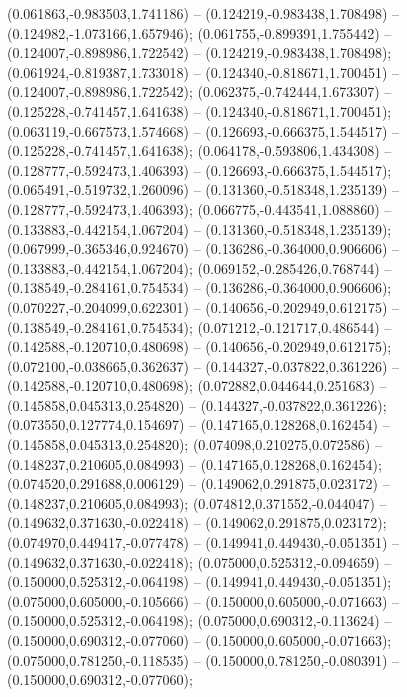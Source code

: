  (0.061863,-0.983503,1.741186) -- (0.124219,-0.983438,1.708498) -- (0.124982,-1.073166,1.657946);
 (0.061755,-0.899391,1.755442) -- (0.124007,-0.898986,1.722542) -- (0.124219,-0.983438,1.708498);
 (0.061924,-0.819387,1.733018) -- (0.124340,-0.818671,1.700451) -- (0.124007,-0.898986,1.722542);
 (0.062375,-0.742444,1.673307) -- (0.125228,-0.741457,1.641638) -- (0.124340,-0.818671,1.700451);
 (0.063119,-0.667573,1.574668) -- (0.126693,-0.666375,1.544517) -- (0.125228,-0.741457,1.641638);
 (0.064178,-0.593806,1.434308) -- (0.128777,-0.592473,1.406393) -- (0.126693,-0.666375,1.544517);
 (0.065491,-0.519732,1.260096) -- (0.131360,-0.518348,1.235139) -- (0.128777,-0.592473,1.406393);
 (0.066775,-0.443541,1.088860) -- (0.133883,-0.442154,1.067204) -- (0.131360,-0.518348,1.235139);
 (0.067999,-0.365346,0.924670) -- (0.136286,-0.364000,0.906606) -- (0.133883,-0.442154,1.067204);
 (0.069152,-0.285426,0.768744) -- (0.138549,-0.284161,0.754534) -- (0.136286,-0.364000,0.906606);
 (0.070227,-0.204099,0.622301) -- (0.140656,-0.202949,0.612175) -- (0.138549,-0.284161,0.754534);
 (0.071212,-0.121717,0.486544) -- (0.142588,-0.120710,0.480698) -- (0.140656,-0.202949,0.612175);
 (0.072100,-0.038665,0.362637) -- (0.144327,-0.037822,0.361226) -- (0.142588,-0.120710,0.480698);
 (0.072882,0.044644,0.251683) -- (0.145858,0.045313,0.254820) -- (0.144327,-0.037822,0.361226);
 (0.073550,0.127774,0.154697) -- (0.147165,0.128268,0.162454) -- (0.145858,0.045313,0.254820);
 (0.074098,0.210275,0.072586) -- (0.148237,0.210605,0.084993) -- (0.147165,0.128268,0.162454);
 (0.074520,0.291688,0.006129) -- (0.149062,0.291875,0.023172) -- (0.148237,0.210605,0.084993);
 (0.074812,0.371552,-0.044047) -- (0.149632,0.371630,-0.022418) -- (0.149062,0.291875,0.023172);
 (0.074970,0.449417,-0.077478) -- (0.149941,0.449430,-0.051351) -- (0.149632,0.371630,-0.022418);
 (0.075000,0.525312,-0.094659) -- (0.150000,0.525312,-0.064198) -- (0.149941,0.449430,-0.051351);
 (0.075000,0.605000,-0.105666) -- (0.150000,0.605000,-0.071663) -- (0.150000,0.525312,-0.064198);
 (0.075000,0.690312,-0.113624) -- (0.150000,0.690312,-0.077060) -- (0.150000,0.605000,-0.071663);
 (0.075000,0.781250,-0.118535) -- (0.150000,0.781250,-0.080391) -- (0.150000,0.690312,-0.077060);
